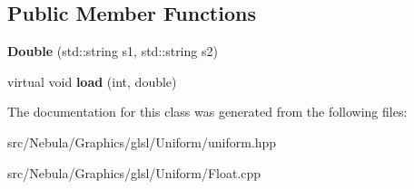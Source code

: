 \subsection*{\-Public \-Member \-Functions}
\begin{DoxyCompactItemize}
\item 
\hypertarget{classNeb_1_1glsl_1_1Uniform_1_1Vector_1_1Double_a4f5b3ffeff4c2d183a7af7401c434731}{{\bfseries \-Double} (std\-::string s1, std\-::string s2)}\label{classNeb_1_1glsl_1_1Uniform_1_1Vector_1_1Double_a4f5b3ffeff4c2d183a7af7401c434731}

\item 
\hypertarget{classNeb_1_1glsl_1_1Uniform_1_1Vector_1_1Double_a36ccba58e251e22e3bffa875ae4491fc}{virtual void {\bfseries load} (int, double)}\label{classNeb_1_1glsl_1_1Uniform_1_1Vector_1_1Double_a36ccba58e251e22e3bffa875ae4491fc}

\end{DoxyCompactItemize}


\-The documentation for this class was generated from the following files\-:\begin{DoxyCompactItemize}
\item 
src/\-Nebula/\-Graphics/glsl/\-Uniform/uniform.\-hpp\item 
src/\-Nebula/\-Graphics/glsl/\-Uniform/\-Float.\-cpp\end{DoxyCompactItemize}
